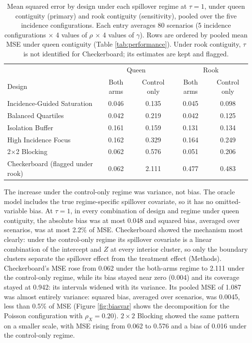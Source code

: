 \documentclass[11pt]{article}
\begin{document}
\begin{table}[!htb]

\small
\centering
\setlength{\tabcolsep}{4pt}

\caption{Mean squared error by design under each spillover regime at $\tau = 1$, under queen contiguity (primary) and rook contiguity (sensitivity), pooled over the five incidence configurations. Each entry averages 80 scenarios (5 incidence configurations $\times$ 4 values of $\rho$ $\times$ 4 values of $\gamma$). Rows are ordered by pooled mean MSE under queen contiguity (Table \ref{tab:performance}). Under rook contiguity, $\tau$ is not identified for Checkerboard; its estimates are kept and flagged.}
\label{tab:regime}

\begin{tabular}{lcccc}

\toprule
& \multicolumn{2}{c}{Queen} & \multicolumn{2}{c}{Rook} \\
Design & Both arms & Control only & Both arms & Control only \\

\midrule
Incidence-Guided Saturation & 0.046 & 0.135 & 0.045 & 0.098 \\
Balanced Quartiles & 0.042 & 0.219 & 0.042 & 0.125 \\
Isolation Buffer & 0.161 & 0.159 & 0.131 & 0.134 \\
High Incidence Focus & 0.162 & 0.329 & 0.164 & 0.249 \\
2$\times$2 Blocking & 0.062 & 0.576 & 0.051 & 0.206 \\
Checkerboard (flagged under rook) & 0.062 & 2.111 & 0.477 & 0.483 \\

\bottomrule

\end{tabular}

\end{table}

The increase under the control-only regime was variance, not bias. The
oracle model includes the true regime-specific spillover covariate, so
it has no omitted-variable bias. At \(\tau = 1\), in every combination
of design and regime under queen contiguity, the absolute bias was at
most 0.048 and squared bias, averaged over scenarios, was at most 2.2\%
of MSE. Checkerboard showed the mechanism most clearly: under the
control-only regime its spillover covariate is a linear combination of
the intercept and \(Z\) at every interior cluster, so only the boundary
clusters separate the spillover effect from the treatment effect
(Methods). Checkerboard's MSE rose from 0.062 under the both-arms regime
to 2.111 under the control-only regime, while its bias stayed near zero
(0.004) and its coverage stayed at 0.942: its intervals widened with its
variance. Its pooled MSE of 1.087 was almost entirely variance: squared
bias, averaged over scenarios, was 0.0045, less than 0.5\% of MSE
(Figure \ref{fig:biasvar} shows the decomposition for the Poisson
configuration with \(\rho_X = 0.20\)). \(2\times2\) Blocking showed the
same pattern on a smaller scale, with MSE rising from 0.062 to 0.576 and
a bias of 0.016 under the control-only regime.
\end{document}
